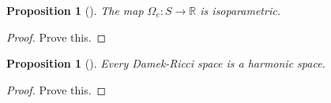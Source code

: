 \documentclass{amsart}[]
\newcommand{\R}{\mathbb R}
\newcommand{\alert}[1]{\color{red}#1\color{black}}
\theoremstyle{plain}
\newtheorem{proposition}[theorem]{Proposition}
\theoremstyle{definition}
\theoremstyle{remark}
\begin{document}
	\begin{proposition}[{\cite[Section 4.4]{tricerri}}]
		The map $\Omega_e: S \rightarrow \R$ is isoparametric.
	\end{proposition}
	\begin{proof}
		\alert{Prove this.}
	\end{proof}

	\begin{proposition}[{\cite[Section 4.4]{tricerri}}]
		Every Damek-Ricci space is a harmonic space.
	\end{proposition}
	\begin{proof}
		\alert{Prove this.}
	\end{proof}
	

	
	


	
\end{document}
